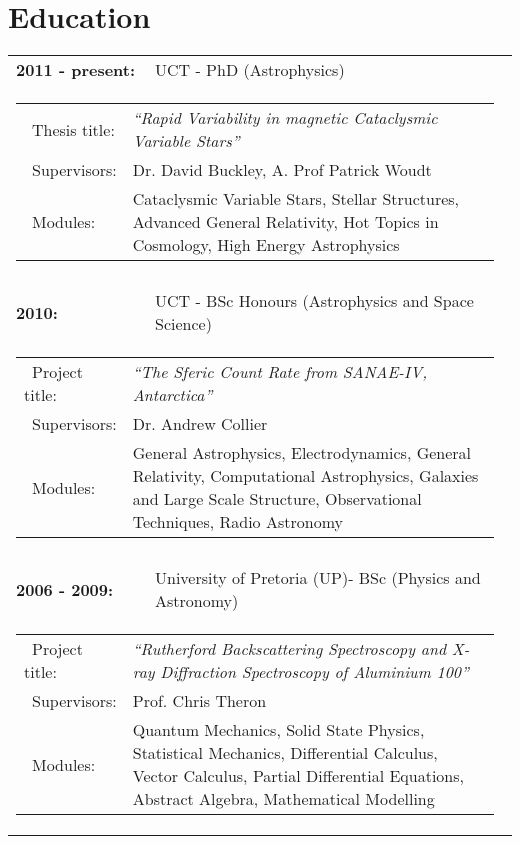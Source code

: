 \documentclass{article}
\begin{document}
\section*{Education}
\begin{tabular}{lll}
  \textbf{2011 - present:} 	& UCT - PhD (Astrophysics)\\
    \multicolumn{3}{c}{\parbox{0.95\textwidth}{
	\begin{tabular}{p{0.175\linewidth}p{0.8\linewidth}}
	  \textbullet\ Thesis title: 	& \emph{``Rapid Variability in magnetic Cataclysmic Variable Stars''} \\
	  \textbullet\ Supervisors:	& Dr. David Buckley, A. Prof Patrick Woudt \\
	  \textbullet\ Modules: 	& Cataclysmic Variable Stars, Stellar Structures, Advanced General Relativity, Hot Topics in Cosmology, High Energy Astrophysics \\ 
	\end{tabular} }}
      \\ \\
%   
  \textbf{2010:} 		& UCT - BSc Honours (Astrophysics and Space Science) \\
    \multicolumn{3}{c}{\parbox{0.95\textwidth}{
	\begin{tabular}{p{0.175\linewidth}p{0.8\linewidth}}
	  \textbullet\ Project title:	& \emph{``The Sferic Count Rate from SANAE-IV, Antarctica''} \\
	  \textbullet\ Supervisors:	& Dr. Andrew Collier	\\
	  \textbullet\ Modules: 	& General Astrophysics, Electrodynamics, General Relativity, Computational Astrophysics, Galaxies and Large Scale Structure, Observational Techniques, Radio Astronomy\\ 
	\end{tabular} }}
      \\ \\
%   
  \textbf{2006 - 2009:} 		& University of Pretoria (UP)-  BSc (Physics and Astronomy) \\ %
    \multicolumn{3}{c}{\parbox{0.95\textwidth}{
	\begin{tabular}{p{0.175\linewidth}p{0.8\linewidth}}
	  \textbullet\ Project title:	& \emph{``Rutherford Backscattering Spectroscopy and X-ray Diffraction Spectroscopy of Aluminium 100''} \\
	  \textbullet\ Supervisors:	& Prof. Chris Theron\\
	  \textbullet\ Modules: 	& Quantum Mechanics, Solid State Physics, Statistical Mechanics, Differential Calculus, Vector Calculus, Partial Differential Equations, Abstract Algebra, Mathematical Modelling\\
	\end{tabular} }}
      \\
%       
 \end{tabular}
% 
% 
\end{document}
